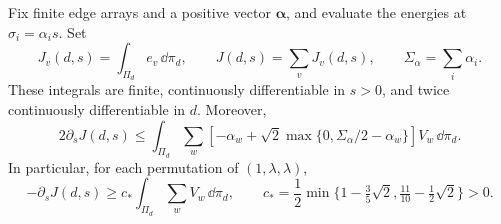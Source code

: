 \begin{lemma}\label{lem:plane-dissipation}
Fix finite edge arrays and a positive vector $\boldsymbol\alpha$, and
evaluate the energies at $\sigma_i=\alpha_i s$.  Set
\[
 J_v(d,s)=\int_{\Pi_d}e_v\,\dd\pi_d,
 \qquad J(d,s)=\sum_vJ_v(d,s),
 \qquad \Sigma_\alpha=\sum_i\alpha_i.
\]
These integrals are finite, continuously differentiable in $s>0$, and
twice continuously differentiable in $d$.  Moreover,
\begin{equation}\label{eq:heat-plane-dissipation}
 2\partial_sJ(d,s)\le\int_{\Pi_d}\sum_w
 \left[-\alpha_w+
 \sqrt2\max\{0,\Sigma_\alpha/2-\alpha_w\}\right]V_w\,\dd\pi_d.
\end{equation}
In particular, for each permutation of $(1,\lambda,\lambda)$,
\begin{equation}\label{eq:heat-strict}
 -\partial_sJ(d,s)\ge c_*\int_{\Pi_d}\sum_wV_w\,\dd\pi_d,
 \qquad
 c_* = \frac12\min\{1-\tfrac35\sqrt2,\tfrac{11}{10}-\tfrac12\sqrt2\}>0.
\end{equation}
\end{lemma}
